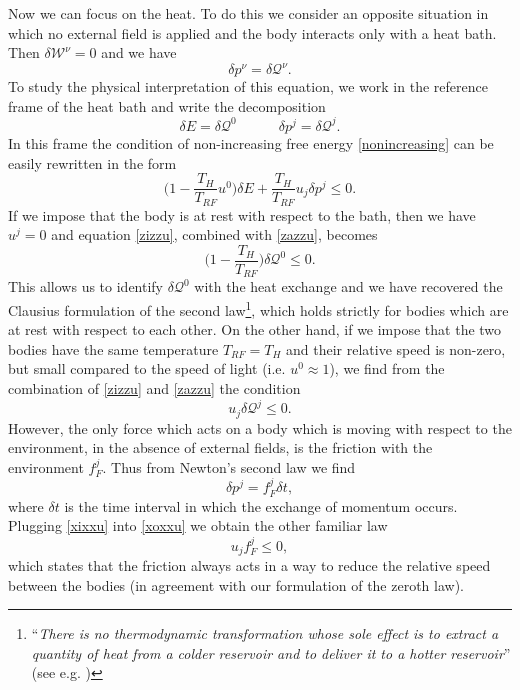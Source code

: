 \documentclass[twocolumn,usenatbib]{mnras2}
\newcommand{\spc}{\quad \quad \quad}
\begin{document}
Now we can focus on the heat. To do this we consider an opposite situation in which no external field is applied and the body interacts only with a heat bath. Then $\delta \mathcal{W}^\nu =0$ and we have
\begin{equation}\label{zozzu}
\delta p^\nu = \delta \mathcal{Q}^\nu.
\end{equation}
To study the physical interpretation of this equation, we work in the reference frame of the heat bath and write the decomposition
\begin{equation}\label{zazzu}
\delta E = \delta \mathcal{Q}^0  \spc  \delta p^j= \delta \mathcal{Q}^j.
\end{equation}
In this frame the condition of non-increasing free energy \eqref{nonincreasing} can be easily rewritten in the form
\begin{equation}\label{zizzu}
\bigg( 1- \dfrac{T_H}{T_{RF}} u^0 \bigg) \delta E + \dfrac{T_H}{T_{RF}} u_j \delta p^j \leq 0.
\end{equation}
If we impose that the body is at rest with respect to the bath, then we have $u^j =0$ and equation \eqref{zizzu}, combined with \eqref{zazzu}, becomes
\begin{equation}
\bigg( 1- \dfrac{T_H}{T_{RF}} \bigg) \delta \mathcal{Q}^0 \leq 0.
\end{equation}
This allows us to identify $\delta \mathcal{Q}^0$ with the heat exchange and we have recovered the Clausius formulation of the second law\footnote{``\textit{There is no thermodynamic transformation whose sole effect is to extract a quantity of heat from a colder reservoir and to deliver it to a hotter reservoir}'' (see e.g. \citealt{huang_book})}, which holds strictly for bodies which are at rest with respect to each other. On the other hand, if we impose that the two bodies have the same temperature $T_{RF}=T_H$ and their relative speed is non-zero, but small compared to the speed of light (i.e. $u^0 \approx 1$), we find from the combination of \eqref{zizzu} and \eqref{zazzu} the condition
\begin{equation}\label{xoxxu}
u_j \delta \mathcal{Q}^j \leq 0.
\end{equation}
However, the only force which acts on a body which is moving with respect to the environment, in the absence of external fields, is the friction with the environment $f_{F}^j$. Thus from Newton's second law we find
\begin{equation}\label{xixxu}
 \delta p^j =f_{F}^j \delta t,  
\end{equation}
where $\delta t$ is the time interval in which the exchange of momentum occurs. Plugging \eqref{xixxu} into \eqref{xoxxu} we obtain the other familiar law
\begin{equation}
u_j f_{F}^j \leq 0,
\end{equation}
which states that the friction always acts in a way to reduce the relative speed between the bodies (in agreement with our formulation of the zeroth law).
\end{document}
